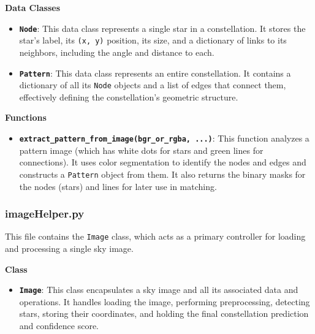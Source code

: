 \documentclass[a4paper,11pt]{article}
\begin{document}
	\textbf{Data Classes}
	\begin{itemize}
		\item \textbf{\texttt{Node}}: This data class represents a single star in a constellation. It stores the star's label, its \texttt{(x, y)} position, its size, and a dictionary of links to its neighbors, including the angle and distance to each.
		\item \textbf{\texttt{Pattern}}: This data class represents an entire constellation. It contains a dictionary of all its \texttt{Node} objects and a list of edges that connect them, effectively defining the constellation's geometric structure.
	\end{itemize}
	
	\textbf{Functions}
	\begin{itemize}
		\item \textbf{\texttt{extract\_pattern\_from\_image(bgr\_or\_rgba, ...)}}: This function analyzes a pattern image (which has white dots for stars and green lines for connections). It uses color segmentation to identify the nodes and edges and constructs a \texttt{Pattern} object from them. It also returns the binary masks for the nodes (stars) and lines for later use in matching.
	\end{itemize}
	
	\subsubsection*{imageHelper.py}
	\hrulefill
	
	This file contains the \texttt{Image} class, which acts as a primary controller for loading and processing a single sky image.
	
	\textbf{Class}
	\begin{itemize}
		\item \textbf{\texttt{Image}}: This class encapsulates a sky image and all its associated data and operations. It handles loading the image, performing preprocessing, detecting stars, storing their coordinates, and holding the final constellation prediction and confidence score.
	\end{itemize}
	
\end{document}
